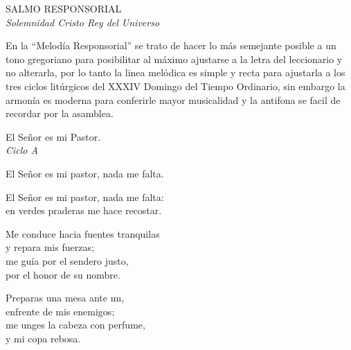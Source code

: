 \documentclass[12pt, letterpaper]{report}
\begin{document}



    \begin{center}
      {\large SALMO RESPONSORIAL}\\
      \textit{Solemnidad Cristo Rey del Universo}
    \end{center}

    En la ``Melod\'ia Responsorial'' se trato de hacer lo m\'as semejante posible a un tono gregoriano para posibilitar al m\'aximo ajustarse a la letra del leccionario y no alterarla, por lo tanto la linea mel\'odica es simple y recta para ajustarla a los tres ciclos litúrgicos del XXXIV Domingo del Tiempo Ordinario, sin embargo la armon\'ia es moderna para conferirle mayor musicalidad y la antifona se facil de recordar por la asamblea.

    \noindent
    {\large El Señor es mi Pastor.}\\
    \textit{Ciclo A}

    \noindent
    El Se\~nor es mi pastor, nada me falta.

    \noindent
    El Se\~nor es mi pastor, nada me falta:\\
    en verdes praderas me hace recostar.

    \noindent
    Me conduce hacia fuentes tranquilas\\
    y repara mis fuerzas;\\
    me gu\'ia por el sendero justo,\\
    por el honor de su nombre.

    \noindent
    Preparas una mesa ante m\i,\\
    enfrente de mis enemigos;\\
    me unges la cabeza con perfume,\\
    y mi copa rebosa.
\end{document}
